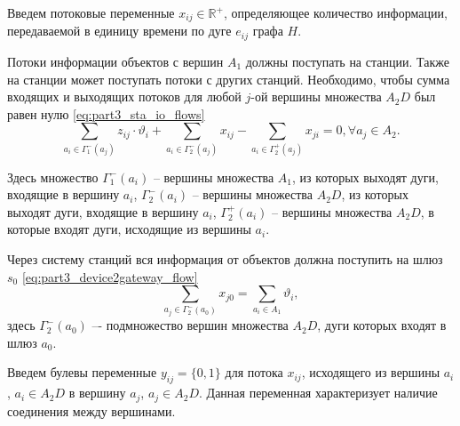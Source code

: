 Введем потоковые переменные $x_{ij} \in \mathbb{R}^+$, определяющее количество информации, передаваемой в единицу времени по дуге $e_{ij}$ графа $H$.

Потоки информации объектов с вершин $A_1$ должны поступать на станции. Также на станции может поступать потоки с других станций. Необходимо, чтобы сумма входящих и выходящих потоков для любой $j$-ой вершины множества $A_2D$ был равен нулю \cref{eq:part3_sta_io_flows} 
\begin{equation}\label{eq:part3_sta_io_flows} 
    \sum_{a_i \in \Gamma_1^-(a_j)} z_{ij} \cdot \vartheta_i + \sum_{a_i \in \Gamma_2^-(a_j)} x_{ij} -  \sum_{a_i \in \Gamma_2^+(a_j)} x_{ji} =0 ,\forall a_j \in A_2. 
\end{equation} 


Здесь множество $\Gamma_1^-(a_i)$ -- вершины множества $A_1$, из которых выходят дуги, входящие в вершину $a_i$, $\Gamma_2^-(a_i)$ -- вершины множества $A_2D$, из которых выходят дуги, входящие в  вершину $a_i$, $\Gamma_2^+(a_i)$ -- вершины множества $A_2D$, в которые входят дуги, исходящие из вершины  $a_i$.

Через систему станций вся информация от объектов  должна поступить на шлюз $s_0$ \cref{eq:part3_device2gateway_flow} 
\begin{equation}\label{eq:part3_device2gateway_flow}
    \sum_{a_j \in \Gamma_2^-(a_0)} x_{j0} = \sum_{a_i \in A_1} \vartheta_i,
\end{equation}
здесь $\Gamma_2^-(a_0)$ –- подмножество вершин множества $A_2D$, дуги которых входят в шлюз $a_0$.

Введем булевы переменные $y_{ij} = \{0,1\}$ для потока $x_{ij}$, исходящего из вершины $a_i$, $a_i \in A_2D$ в вершину $a_j$, $a_j \in A_2D$. Данная переменная характеризует наличие соединения между вершинами.

